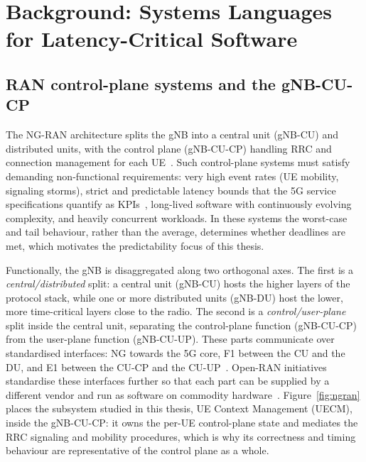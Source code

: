 \documentclass[english,twoside,openright,a4paper,censored,csm,software-track-2020]{HYthesisML}
\begin{document}
\chapter{Background: Systems Languages for Latency-Critical Software\label{chapter:background}}

\section{RAN control-plane systems and the gNB-CU-CP}
The NG-RAN architecture splits the gNB into a central unit (gNB-CU) and distributed units,
with the control plane (gNB-CU-CP) handling RRC and connection management for each
UE~\cite{3gpp38401,3gpp38300,3gpp38331}. Such control-plane systems must satisfy demanding
non-functional requirements: very high event rates (UE mobility, signaling storms), strict
and predictable latency bounds that the 5G service specifications quantify as
KPIs~\cite{3gpp22261}, long-lived software with continuously evolving complexity,
and heavily concurrent workloads. In these systems the worst-case and tail behaviour,
rather than the average, determines whether deadlines are met, which motivates the
predictability focus of this thesis.

Functionally, the gNB is disaggregated along two orthogonal axes. The first is a
\emph{central/distributed} split: a central unit (gNB-CU) hosts the higher layers of the
protocol stack, while one or more distributed units (gNB-DU) host the lower, more
time-critical layers close to the radio. The second is a \emph{control/user-plane} split
inside the central unit, separating the control-plane function (gNB-CU-CP) from the
user-plane function (gNB-CU-UP). These parts communicate over standardised
interfaces: NG towards the 5G core, F1 between the CU and the DU, and E1 between the CU-CP and
the CU-UP~\cite{3gpp38401,3gpp38300,3gpp38463}. Open-RAN initiatives standardise these interfaces
further so that each part can be supplied by a different vendor and run as software on
commodity hardware~\cite{polese2023oran}. Figure~\ref{fig:ngran} places the subsystem studied
in this thesis, UE Context Management (UECM), inside the gNB-CU-CP: it owns the per-UE
control-plane state and mediates the RRC signaling and mobility procedures, which is why its
correctness and timing behaviour are representative of the control plane as a whole.
\end{document}
